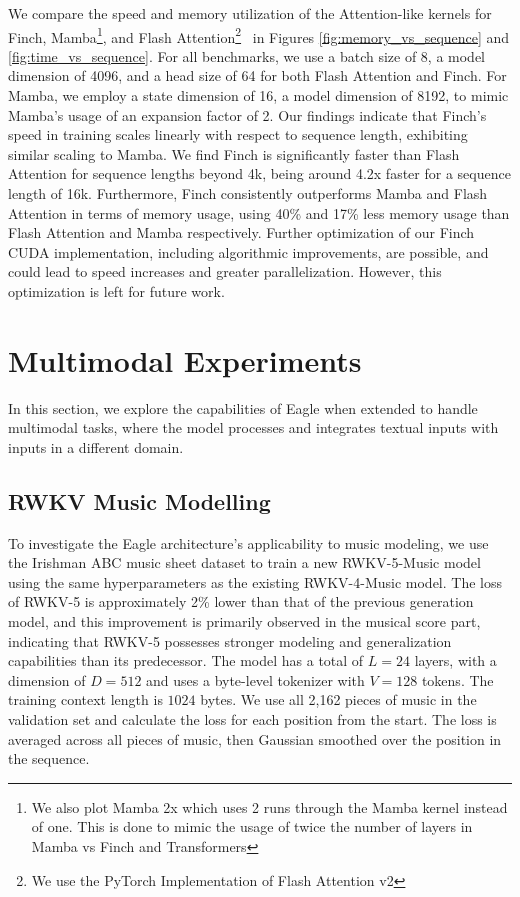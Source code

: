 We compare the speed and memory utilization of the Attention-like kernels for Finch, Mamba\footnote{We also plot Mamba 2x which uses 2 runs through the Mamba kernel instead of one. This is done to mimic the usage of twice the number of layers in Mamba vs Finch and Transformers}, and Flash Attention\footnote{We use the PyTorch Implementation of Flash Attention v2}~\citep{dao2023flashattention2} in Figures \ref{fig:memory_vs_sequence} and \ref{fig:time_vs_sequence}. For all benchmarks, we use a batch size of 8, a model dimension of 4096, and a head size of 64 for both Flash Attention and Finch. For Mamba, we employ a state dimension of 16, a model dimension of 8192, to mimic Mamba's usage of an expansion factor of 2. Our findings indicate that Finch's speed in training scales linearly with respect to sequence length, exhibiting similar scaling to Mamba. We find Finch is significantly faster than Flash Attention for sequence lengths beyond 4k, being around 4.2x faster for a sequence length of 16k. Furthermore, Finch consistently outperforms Mamba and Flash Attention in terms of memory usage, using 40\% and 17\% less memory usage than Flash Attention and Mamba respectively. Further optimization of our Finch CUDA implementation, including algorithmic improvements, are possible, and could lead to speed increases and greater parallelization. However, this optimization is left for future work.

\section{Multimodal Experiments}
\label{sec:multimodal_experiments}

In this section, we explore the capabilities of Eagle when extended to handle multimodal tasks, where the model processes and integrates textual inputs with inputs in a different domain.

\subsection{RWKV Music Modelling}
\label{sec:music-modelling}
To investigate the Eagle architecture's applicability to music modeling, we use the Irishman ABC music sheet dataset \citep{wu2023tunesformer} to train a new RWKV-5-Music model using the same hyperparameters as the existing RWKV-4-Music model. The loss of RWKV-5 is approximately 2\% lower than that of the previous generation model, and this improvement is primarily observed in the musical score part, indicating that RWKV-5 possesses stronger modeling and generalization capabilities than its predecessor. The model has a total of $L=24$ layers, with a dimension of $D=512$ and uses a byte-level tokenizer with $V=128$ tokens. The training context length is $1024$ bytes. We use all 2,162 pieces of music in the validation set and calculate the loss for each position from the start. The loss is averaged across all pieces of music, then Gaussian smoothed over the position in the sequence.

